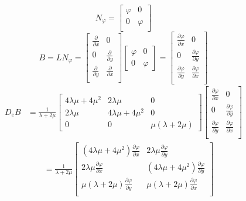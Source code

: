 \documentclass[12pt]{article}
\begin{document}
%
\begin{equation}	\label{eq44b}
N_{\varphi} =\left[
\begin{array}{cc}
\varphi & 0   			\\
0 &\varphi  				\\
\end{array}
\right]
\end{equation}
%
\newline
\newline
%
\newline
\begin{equation}		\label{eq46b}
B=LN_{\varphi}= \left[
\begin{array}{cc}
\frac{\partial}{\partial x} & 0   			\\
0 &\frac{\partial}{\partial y} 				\\
\frac{\partial}{\partial y} & \frac{\partial}{\partial x}   			\\
\end{array}
\right]
%
\left[
\begin{array}{cc}
\varphi & 0  			\\
0 &\varphi   				
\end{array}
\right]
=
 \left[
\begin{array}{cc}
\frac{\partial \varphi}{\partial x} & 0   			\\
0 &\frac{\partial \varphi}{\partial y} 				\\
\frac{\partial \varphi}{\partial y} & \frac{\partial \varphi}{\partial x}   			\\
\end{array}
\right]
\end{equation}
%
\begin{equation}	\label{eq47b}
\begin{split}
D_eB& = \frac{1}{\lambda+2\mu}
\left[
\begin{array}{ccc}
4\lambda\mu+4\mu^2 & 2\lambda\mu & 0 			\\
2\lambda\mu &4\lambda\mu+4\mu^2 & 0 			\\
0 & 0 & \mu(\lambda+2\mu) 		
\end{array}
\right]
%
 \left[
\begin{array}{cc}
\frac{\partial \varphi}{\partial x} & 0   			\\
0 &\frac{\partial \varphi}{\partial y} 				\\
\frac{\partial \varphi}{\partial y} & \frac{\partial \varphi}{\partial x}   			\\
\end{array}
\right]	\\
%
& \qquad= \frac{1}{\lambda+2\mu}
\left[
\begin{array}{cc}
(4\lambda\mu+4\mu^2)\frac{\partial \varphi}{\partial x} & 2\lambda\mu\frac{\partial \varphi}{\partial y}  			\\
2\lambda\mu\frac{\partial \varphi}{\partial x} &	(4\lambda\mu+4\mu^2)\frac{\partial \varphi}{\partial y} 			\\
\mu(\lambda+2\mu) \frac{\partial \varphi}{\partial y} & \mu(\lambda+2\mu) \frac{\partial \varphi}{\partial x}  			\\
\end{array}
\right]
\end{split}
\end{equation}
\end{document}
